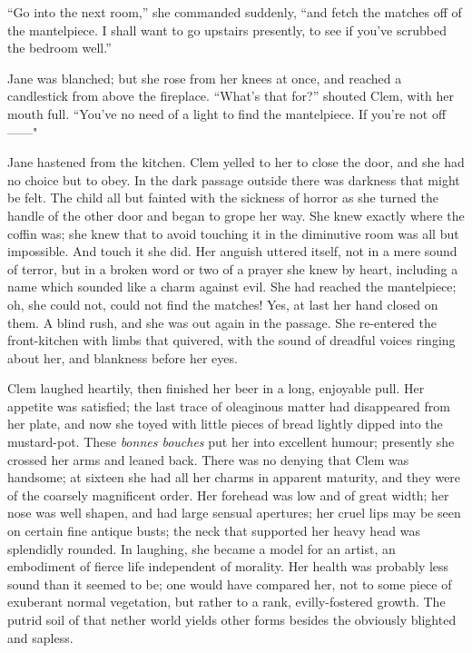 ``Go into the next room,'' she commanded suddenly, ``and fetch the
matches off of the mantelpiece. I shall want to go upstairs presently,
to see if you've scrubbed the bedroom well.''

Jane was blanched; but she rose from her knees at once, and reached a
candlestick from above the fireplace. ``What's that for?'' shouted Clem,
with her mouth full. ``You've no need of a light to find the
mantelpiece. If you're not off{{------}}"

Jane hastened from the kitchen. Clem yelled to her to close the door,
and she had no choice but to obey. In the dark passage outside there was
darkness that might be felt. The child all but fainted with the
{}sickness of horror as she turned the handle of the other door and
began to grope her way. She knew exactly where the coffin was; she knew
that to avoid touching it in the diminutive room was all but impossible.
And touch it she did. Her anguish uttered itself, not in a mere sound of
terror, but in a broken word or two of a prayer she knew by heart,
including a name which sounded like a charm against evil. She had
reached the mantelpiece; oh, she could not, could not find the matches!
Yes, at last her hand closed on them. A blind rush, and she was out
again in the passage. She re-entered the front-kitchen with limbs that
quivered, with the sound of dreadful voices ringing about her, and
blankness before her eyes.

Clem laughed heartily, then finished her beer in a long, enjoyable pull.
Her appetite was satisfied; the last trace of oleaginous matter had
disappeared from her plate, and now she toyed with little pieces of
bread lightly dipped into the mustard-pot. These {}\emph{bonnes bouches}
put her into excellent humour; presently she crossed her arms and leaned
back. There was no denying that Clem was handsome; at sixteen she had
all her charms in apparent maturity, and they were of the coarsely
magnificent order. Her forehead was low and of great width; her nose was
well shapen, and had large sensual apertures; her cruel lips may be seen
on certain fine antique busts; the neck that supported her heavy head
was splendidly rounded. In laughing, she became a model for an artist,
an embodiment of fierce life independent of morality. Her health was
probably less sound than it seemed to be; one would have compared her,
not to some piece of exuberant normal vegetation, but rather to a rank,
evilly-fostered growth. The putrid soil of that nether world yields
other forms besides the obviously blighted and sapless.

